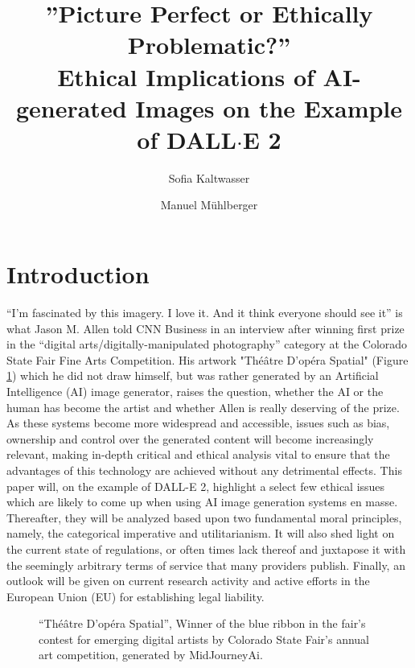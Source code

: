 \documentclass[10pt,twocolumn,twoside]{osajnl}
\title{”Picture Perfect or Ethically Problematic?” \\ Ethical Implications of AI-generated Images on the Example of DALL$\cdot$E 2}
\author[1]{Sofia Kaltwasser}
\author[2]{Manuel Mühlberger}
\affil[1]{University of Potsdam}
\affil[2]{School of Computation, Information and Technology, TU Munich}
\begin{document}
\maketitle

\section{Introduction}
“I’m fascinated by this imagery. I love it. And it think everyone should see it” is what Jason M. Allen told CNN Business in an interview after winning first prize in the “digital arts/digitally-manipulated photography” category at the Colorado State Fair Fine Arts Competition\cite{JasonMAllenCNN}.
His artwork "Théâtre D’opéra Spatial" (Figure \ref{Theatre}) which he did not draw himself, but was rather generated by an Artificial Intelligence (AI) image generator, raises the question, whether the AI or the human has become the artist and whether Allen is really deserving of the prize.
As these systems become more widespread and accessible, issues such as bias, ownership and control over the generated content will become increasingly relevant, making in-depth critical and ethical analysis vital to ensure that the advantages of this technology are achieved without any detrimental effects. 
This paper will, on the example of DALL-E 2, highlight a select few ethical issues which are likely to come up when using AI image generation systems en masse. 
Thereafter, they will be analyzed based upon two fundamental moral principles, namely, the categorical imperative and utilitarianism. 
It will also shed light on the current state of regulations, or often times lack thereof and juxtapose it with the seemingly arbitrary terms of service that many providers publish. 
Finally, an outlook will be given on current research activity and active efforts in the European Union (EU) for establishing legal liability. 
\begin{figure}[htbp]
	\centering
	\caption{“Théâtre D’opéra Spatial”, Winner of the blue ribbon in the fair’s contest for emerging digital artists by Colorado State Fair’s annual art competition, generated by MidJourneyAi\cite{OperaSpecial}.}
	\label{Theatre}
\end{figure}
\end{document}
